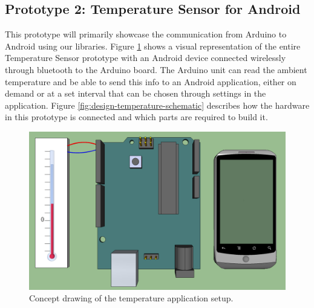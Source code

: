 	
\subsection{Prototype 2: Temperature Sensor for Android} \label{section:prototype-temp}
This prototype will primarily showcase the communication from Arduino to Android using our libraries. 
Figure \ref{fig:design-temperature} shows a visual representation of the entire Temperature Sensor
prototype with an Android device connected wirelessly through bluetooth to the Arduino board. The 
Arduino unit can read the ambient temperature and be able to send this info to an Android application,
 either on demand or at a set interval that can be chosen through settings in the application. Figure \ref{fig:design-temperature-schematic} describes how the hardware in this prototype is connected and which parts are required to build it.

\begin{figure}[h!]
	\centering
	\includegraphics[scale=0.35]{img/design-temperature}
	\caption{Concept drawing of the temperature application setup.}
	\label{fig:design-temperature}
\end{figure}

